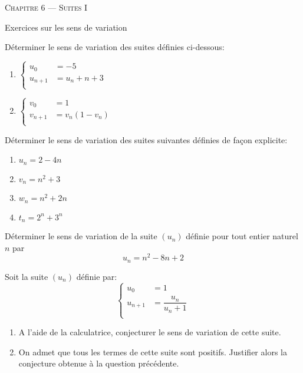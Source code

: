 \documentclass[a4paper]{article}
\begin{document}
\begin{center}
  {\scshape\LARGE Chapitre 6 --- Suites I\par}
  \vspace{0.5cm}
\end{center}
\begin{center}
  {\LARGE Exercices sur les sens de variation \par}
  \vspace{0.5cm}
\end{center}

\begin{exerciceinterro}{}{}
Déterminer le sens de variation des suites définies ci-dessous:
\begin{enumerate}
    \item 			$\begin{cases}
        u_0 &=-5\\
        u_{n+1} &=u_n+n+3\\
\end{cases}$
\item 			$\begin{cases}
    v_0 &=1\\
    v_{n+1} &=v_n(1-v_n)\\
\end{cases}$

   
\end{enumerate}
\end{exerciceinterro}


\begin{exerciceinterro}{}{}
Déterminer le sens de variation des suites suivantes définies de façon explicite:
\begin{enumerate}
    \item $u_n=2-4n$
    \item $v_n=n^2+3$
    \item $w_n=n^2+2n$
    \item $t_n=2^n+3^n$
\end{enumerate}

\end{exerciceinterro}
\begin{exerciceinterro}{}{}
    Déterminer le sens de variation de la suite $(u_n)$ définie pour tout entier naturel $n$ par
    $$u_n=n^2-8n+2$$
\end{exerciceinterro}

\begin{exerciceinterro}{}{}
Soit la suite $(u_n)$ définie par:
$$\begin{cases}
    u_0 &=1\\
    u_{n+1} &=\dfrac{u_n}{u_n+1}\\
\end{cases}$$
\begin{enumerate}
    \item A l'aide de la calculatrice, conjecturer le sens de variation de cette suite.
    \item On admet que tous les termes de cette suite sont positifs. Justifier alors la conjecture obtenue à la question précédente.
\end{enumerate}
\end{exerciceinterro}
\end{document}
